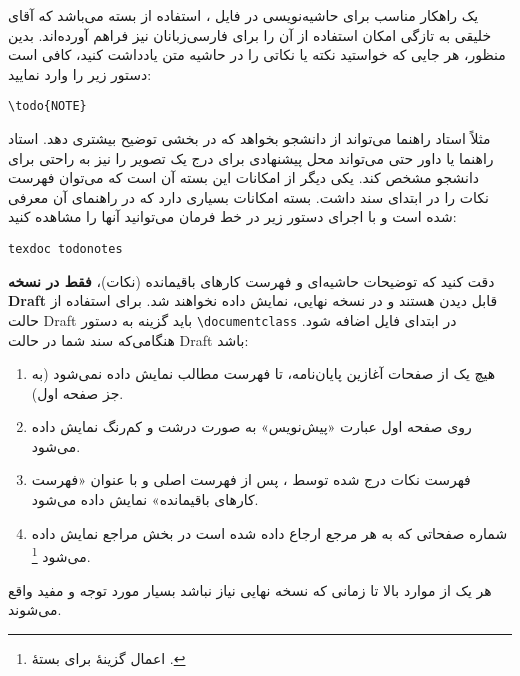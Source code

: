 یک راهکار مناسب برای حاشیه‌نویسی در فایل ، استفاده از بسته 
می‌باشد که آقای خلیقی به تازگی امکان استفاده از آن را برای فارسی‌زبانان نیز فراهم آورده‌اند.
بدین منظور، هر جایی که خواستید نکته یا نکاتی را در حاشیه متن یادداشت کنید، کافی است دستور زیر را وارد نمایید:
\begin{latin}
\verb|\todo{NOTE}|
\end{latin}
مثلاً استاد راهنما می‌تواند از دانشجو بخواهد که در بخشی توضیح بیشتری دهد.
استاد راهنما یا داور حتی می‌تواند محل پیشنهادی برای درج یک تصویر را نیز به راحتی برای دانشجو مشخص کند.
یکی دیگر از امکانات این بسته آن است که می‌توان فهرست نکات را در ابتدای سند داشت. بسته 
امکانات بسیاری دارد
که در راهنمای آن معرفی شده است و با اجرای دستور زیر در خط فرمان می‌توانید آنها را مشاهده کنید:
\begin{latin}	
	\texttt{texdoc todonotes}
\end{latin}	
دقت کنید که توضیحات حاشیه‌ای و فهرست کارهای باقیمانده (نکات)،
\textbf{فقط در نسخه
\gls{Draft}}
قابل دیدن هستند و در نسخه نهایی، نمایش داده نخواهند شد.
برای استفاده از حالت
\gls{Draft}
باید گزینه 
به دستور 
\verb|\documentclass|
در ابتدای فایل 
اضافه شود.
هنگامی‌که سند شما در حالت 
\gls{Draft}
باشد:

\singlespacing
\begin{enumerate}
\item 
هیچ یک از صفحات آغازین پایان‌نامه، تا فهرست مطالب نمایش داده نمی‌شود (به جز صفحه اول).
\item
روی صفحه اول عبارت «پیش‌نویس» به صورت درشت و کم‌رنگ نمایش داده می‌شود.
\item
فهرست نکات درج شده توسط
،
پس از فهرست اصلی و با عنوان «فهرست کارهای باقیمانده» نمایش داده می‌شود.
\item
شماره صفحاتی که به هر مرجع ارجاع داده شده است در بخش مراجع نمایش داده می‌شود
\footnote{اعمال گزینهٔ
برای بستهٔ
.
}.
\end{enumerate}
\doublespacing
هر یک از موارد بالا تا زمانی که نسخه نهایی \پ نیاز نباشد بسیار مورد توجه و مفید واقع می‌شوند.
